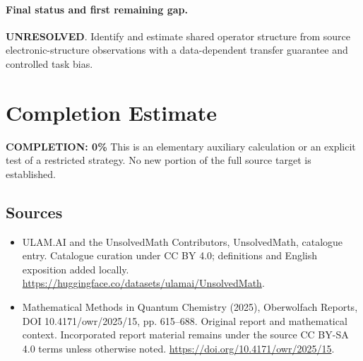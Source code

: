 \documentclass[11pt]{article}
\begin{document}
\paragraph{Final status and first remaining gap.}
\textbf{UNRESOLVED}. Identify and estimate shared operator structure from source electronic-structure observations with a data-dependent transfer guarantee and controlled task bias.

\section{Completion Estimate}
\noindent\textbf{COMPLETION: 0\%}
This is an elementary auxiliary calculation or an explicit test of a restricted strategy. No new portion of the full source target is established.

\subsection{Sources}
\begin{itemize}
\item[\hypertarget{source:statement:1}{S1}] ULAM.AI and the UnsolvedMath Contributors, UnsolvedMath, catalogue entry. Catalogue curation under CC BY 4.0; definitions and English exposition added locally.
\url{https://huggingface.co/datasets/ulamai/UnsolvedMath}.
\item[\hypertarget{source:statement:2}{S2}] Mathematical Methods in Quantum Chemistry (2025), Oberwolfach Reports, DOI 10.4171/owr/2025/15, pp. 615--688. Original report and mathematical context. Incorporated report material remains under the source CC BY-SA 4.0 terms unless otherwise noted.
\url{https://doi.org/10.4171/owr/2025/15}.
\end{itemize}
\label{end:statement}
\end{document}
